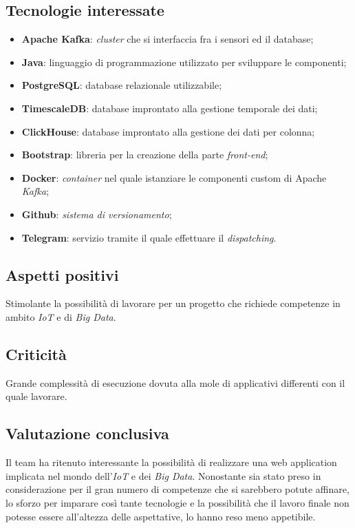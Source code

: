 \subsection{Tecnologie interessate}
\begin{itemize}
	\item \textbf{Apache Kafka\glos}: \textit{cluster\glo} che si interfaccia fra i sensori ed il database;
	\item \textbf{Java}: linguaggio di programmazione utilizzato per sviluppare le componenti;
	\item \textbf{PostgreSQL}: database relazionale utilizzabile;
	\item \textbf{TimescaleDB}: database improntato alla gestione temporale dei dati;
	\item \textbf{ClickHouse}: database improntato alla gestione dei dati per colonna;
	\item \textbf{Bootstrap}: libreria per la creazione della parte \textit{front-end\glos};
	\item \textbf{Docker\glos}: \textit{container\glo} nel quale istanziare le componenti custom di Apache \textit{Kafka\glos};
	\item \textbf{Github}: \textit{sistema di versionamento\glos};
	\item \textbf{Telegram}: servizio tramite il quale effettuare il \textit{dispatching\glos}.
\end{itemize}

\subsection{Aspetti positivi}
Stimolante la possibilità di lavorare per un progetto che richiede competenze in ambito \textit{IoT\glo} e di \textit{Big Data\glos}.


\subsection{Criticità}
Grande complessità di esecuzione dovuta alla mole di applicativi differenti con il quale lavorare.

\subsection{Valutazione conclusiva}
Il team ha ritenuto interessante la possibilità di realizzare una web application implicata nel mondo dell'\textit{IoT\glo} e dei \textit{Big Data\glos}. Nonostante sia stato preso in considerazione per il gran numero di competenze che si sarebbero potute affinare, lo sforzo per imparare così tante tecnologie e la possibilità che il lavoro finale non potesse essere all'altezza delle aspettative, lo hanno reso meno appetibile.